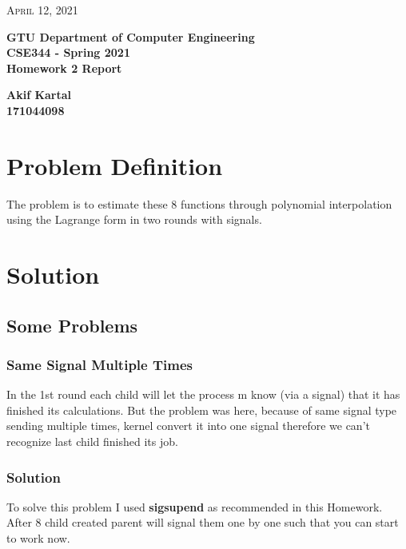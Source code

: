 \documentclass{article}
\begin{document}
\begin{titlepage}

	\begin{flushright}
	\textsc{\large April 12, 2021} \\
	\end{flushright}
	\begin{center}
	\Large{\bfseries GTU Department of Computer Engineering \\ CSE344 - Spring 2021 \\ Homework 2 Report  } \\
	\end{center}
	\vspace*{\fill}
	\begin{center}
	\Large{\bfseries Akif Kartal \\ 171044098 }
	\end{center}
	\vspace*{\fill}

\end{titlepage}

\cleardoublepage
\section{Problem Definition}
The problem is to estimate these 8 functions through polynomial interpolation using the Lagrange form 
in two rounds with signals. 

\section{Solution}
\subsection{Some Problems}
\subsubsection{Same Signal Multiple Times}
In the 1st round each child will let the process m know (via a signal) that it has finished 
its calculations. But the problem was here, because of same signal type sending multiple times,
kernel convert it into one signal therefore we can't recognize last child finished its job.
\subsubsection{Solution}
To solve this problem I used \textbf{sigsupend} as recommended in this Homework. After 8 child created parent
will signal them one by one such that you can start to work now.
\end{document}
